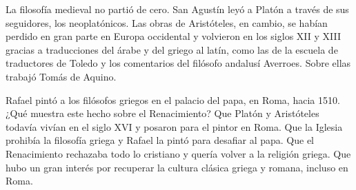 \documentclass[carta,doscolumnas,compacta]{../plantilla/evaluacion}
\begin{document}
\encabezado

\begin{preguntas}

\begin{contexto}
La filosofía medieval no partió de cero. San Agustín leyó a Platón a través de sus seguidores, los
neoplatónicos. Las obras de Aristóteles, en cambio, se habían perdido en gran parte en Europa
occidental y volvieron en los siglos XII y XIII gracias a traducciones del árabe y del griego al
latín, como las de la escuela de traductores de Toledo y los comentarios del filósofo andalusí
Averroes. Sobre ellas trabajó Tomás de Aquino.
\end{contexto}

\begin{pregunta}[D]
Rafael pintó a los filósofos griegos en el palacio del papa, en Roma, hacia 1510. ¿Qué muestra
este hecho sobre el Renacimiento?
\opcioneslargas
  {Que Platón y Aristóteles todavía vivían en el siglo XVI y posaron para el pintor en Roma.}
  {Que la Iglesia prohibía la filosofía griega y Rafael la pintó para desafiar al papa.}
  {Que el Renacimiento rechazaba todo lo cristiano y quería volver a la religión griega.}
  {Que hubo un gran interés por recuperar la cultura clásica griega y romana, incluso en Roma.}
\end{pregunta}


\end{preguntas}
\end{document}
